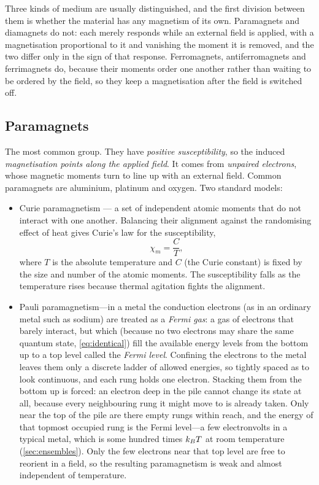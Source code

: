     Three kinds of medium are usually distinguished, and the first division between them is whether the material has any magnetism of its own. Paramagnets and diamagnets do not: each merely responds while an external field is applied, with a magnetisation proportional to it and vanishing the moment it is removed, and the two differ only in the sign of that response. Ferromagnets, antiferromagnets and ferrimagnets do, because their moments order one another rather than waiting to be ordered by the field, so they keep a magnetisation after the field is switched off.

    \subsection{Paramagnets}

        The most common group. They have \emph{positive susceptibility}, so the induced \emph{magnetisation points along the applied field}. It comes from \emph{unpaired electrons}, whose magnetic moments turn to line up with an external field. Common paramagnets are aluminium, platinum and oxygen. Two standard models:

        \begin{itemize}
            \item Curie paramagnetism --- a set of independent atomic moments that do not interact with one another. Balancing their alignment against the randomising effect of heat gives Curie's law for the susceptibility,
            \begin{equation*}
                \chi_m = \frac{C}{T},
            \end{equation*}
            where $T$ is the absolute temperature and $C$ (the Curie constant) is fixed by the size and number of the atomic moments. The susceptibility falls as the temperature rises because thermal agitation fights the alignment.
            \item Pauli paramagnetism---in a metal the conduction electrons (as in an ordinary metal such as sodium) are treated as a \emph{Fermi gas}: a gas of electrons that barely interact, but which (because no two electrons may share the same quantum state, \cref{eq:identical}) fill the available energy levels from the bottom up to a top level called the \emph{Fermi level}. Confining the electrons to the metal leaves them only a discrete ladder of allowed energies, so tightly spaced as to look continuous, and each rung holds one electron. Stacking them from the bottom up is forced: an electron deep in the pile cannot change its state at all, because every neighbouring rung it might move to is already taken. Only near the top of the pile are there empty rungs within reach, and the energy of that topmost occupied rung is the Fermi level---a few electronvolts in a typical metal, which is some hundred times $k_{B} T$ at room temperature (\cref{sec:ensembles}). Only the few electrons near that top level are free to reorient in a field, so the resulting paramagnetism is weak and almost independent of temperature.
        \end{itemize}

